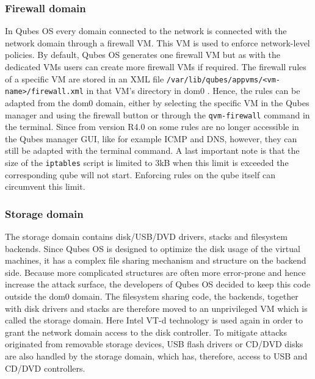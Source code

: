 \documentclass[runningheads,a4paper]{article}
\begin{document}
\subsubsection{Firewall domain}

In Qubes OS every domain connected to the network is connected with
the network domain through a firewall VM. This VM is used to enforce
network-level policies. By default, Qubes OS generates one firewall VM
but as with the dedicated VMs users can create more firewall VMs if
required. The firewall rules of a specific VM are stored in an XML
file \texttt{/var/lib/qubes/appvms/<vm-name>/firewall.xml} in that VM's
directory in dom0 . Hence, the rules can be adapted from the dom0
domain, either by selecting the specific VM in the Qubes manager and
using the firewall button or through the \texttt{qvm-firewall} command
in the terminal. Since from version R4.0 on some rules are no longer
accessible in the Qubes manager GUI, like for example ICMP and DNS,
however, they can still be adapted with the terminal command. A last
important note is that the size of the \texttt{iptables} script is
limited to 3kB when this limit is exceeded the corresponding qube will
not start. Enforcing rules on the qube itself can circumvent this
limit. %

\subsubsection{Storage domain}

The storage domain contains disk/USB/DVD drivers, stacks and
filesystem backends. Since Qubes OS is designed to optimize the disk
usage of the virtual machines, it has a complex file sharing mechanism
and structure on the backend side. Because more complicated structures
are often more error-prone and hence increase the attack surface, the
developers of Qubes OS decided to keep this code outside the dom0
domain. The filesystem sharing code, the backends, together with disk
drivers and stacks are therefore moved to an unprivileged VM which is
called the storage domain. Here Intel VT-d technology is used again in order to grant the network domain access to the disk controller. To
mitigate attacks originated from removable storage devices, USB flash
drivers or CD/DVD disks are also handled by the storage domain, which
has, therefore, access to USB and CD/DVD controllers.
\end{document}
